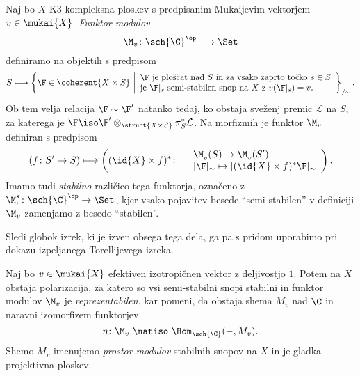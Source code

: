 

\begin{definicija}
    Naj bo $X$ K3 kompleksna ploskev s predpisanim Mukaijevim vektorjem $v \in \mukai{X}$. \emph{Funktor modulov} 
    \[
        \M_v \colon \sch{\C}^\op \longrightarrow \Set
    \]
    definiramo na objektih s predpisom
    \[
        S \longmapsto \left\{\F \in \coherent{X \times S} \ \middle| 
        \begin{array}{l}
            \text{$\F$ je ploščat nad $S$ in za vsako zaprto točko $s \in S$} \\
            \text{je $\F|_s$ semi-stabilen snop na $X$ z $v(\F|_s) = v$.}
        \end{array}
        \right\}_{/\sim}.
    \]
    Ob tem velja relacija $\F \sim \F'$ natanko tedaj, ko obstaja sveženj premic $\mathcal L$ na $S$, za katerega je $\F \iso \F' \otimes_{\struct{X \times S}} \pi_S^*\mathcal L$. Na morfizmih je funktor $\M_v$ definiran s predpisom
    \[
        (f\colon S' \to S) \longmapsto \left( (\id{X} \times f)^* \colon
            \begin{array}{r l}
                & \M^{}_v(S) \to \M^{}_v(S') \\
                & [\F]_\sim \mapsto [(\id{X} \times f)^*\F]_\sim
            \end{array}
            \right).
    \]
    Imamo tudi \emph{stabilno} različico tega funktorja, označeno z $\M_v^{s} \colon \sch{\C}^\op \to \Set$, kjer vsako pojavitev besede ``semi-stabilen'' v definiciji $\M_v$ zamenjamo z besedo ``stabilen''.
\end{definicija}

Sledi globok izrek, ki je izven obsega tega dela, ga pa s pridom uporabimo pri dokazu izpeljanega Torellijevega izreka. 

\begin{izrek}
    \emph{\cite{GottscheHuybrechts1996,huybrechts2006fouriermukai, OGrady1997,HuybrechtsLehn2010,BayerMacri2014}}
    Naj bo $v \in \mukai{X}$ efektiven izotropičnen vektor z deljivostjo $1$. Potem na $X$ obstaja polarizacija, za katero so vsi semi-stabilni snopi stabilni in funktor modulov $\M_v$ je \emph{reprezentabilen}, kar pomeni, da obstaja shema $M_v$ nad $\C$ in naravni izomorfizem funktorjev 
    \begin{equation}
        \label{eq: reprezentabilnostni naravni izo}
        \eta\colon \M_v \ \natiso \ \Hom_{\sch{\C}}(-, M_v).
    \end{equation}
    Shemo $M_v$ imenujemo \emph{prostor modulov} stabilnih snopov na $X$ in je gladka projektivna ploskev. 
\end{izrek}

